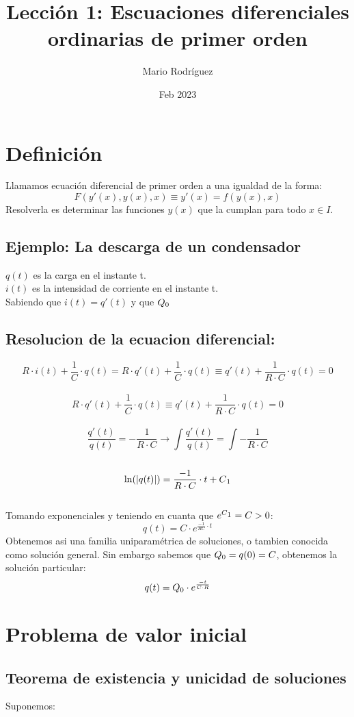 \documentclass{article}
\title{Lección 1: Escuaciones diferenciales ordinarias de primer orden}
\author{Mario Rodríguez}
\date{Feb 2023}
\begin{document}
\maketitle

\section{Definición}
Llamamos ecuación diferencial de primer orden a una igualdad de la forma:
\[F(y'(x), y(x), x) \equiv y'(x)=f(y(x), x)\]
Resolverla es determinar las funciones $y(x)$ que la cumplan para todo $x\in I$.
\subsection{Ejemplo: La descarga de un condensador}
$q(t)$ es la carga en el instante t.\\
$i(t)$ es la intensidad de corriente en el instante t.\\
Sabiendo que $i(t) = q'(t)$ y que $Q\textsubscript{0}$
\subsection{Resolucion de la ecuacion diferencial:}
\[R\cdot i(t)+\frac{1}{C}\cdot q(t) = R\cdot q'(t)+\frac{1}{C}\cdot q(t) \equiv q'(t)+\frac{1}{R\cdot C}\cdot q(t) = 0 \]
\\
\[R\cdot q'(t)+\frac{1}{C}\cdot q(t) \equiv q'(t)+\frac{1}{R\cdot C}\cdot q(t) = 0 \]
\\
\[\frac{q'(t)}{q(t)}=-\frac{1}{R \cdot C} \rightarrow \int\frac{q'(t)}{q(t)} = \int-\frac{1}{R \cdot C} \]
\\
\[ \ln(|q(t)|)= \frac{-1}{R\cdot C}\cdot t + C\textsubscript{1}\]
\\
Tomando exponenciales y teniendo en cuanta que $e^{C\textsubscript{1}}=C>0$:
\[q(t) = C \cdot e^{\frac{-1}{RC}\cdot t}\]
Obtenemos asi una familia uniparamétrica de soluciones, o tambien conocida como solución general.
Sin embargo sabemos que $Q\textsubscript{0}=q(0)=C$, obtenemos la solución particular:
\[q(t)=Q\textsubscript{0}\cdot e^{\frac{-t}{C\cdot R}}\] 

\section*{Problema de valor inicial}
\subsection{Teorema de existencia y unicidad de soluciones}
Suponemos:
\end{document}
